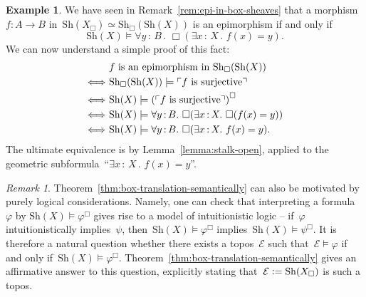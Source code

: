 \documentclass[10pt,reqno,a4paper]{amsbook}
\theoremstyle{definition}
\newtheorem{ex}[defn]{Example}
\theoremstyle{plain}
\theoremstyle{remark}
\newtheorem{rem}[defn]{Remark}
\newcommand{\E}{\mathcal{E}}
\newcommand{\Sh}{\mathrm{Sh}}
\newcommand{\?}{\,{:}\,}
\renewcommand{\_}{\mathpunct{.}\,}
\newcommand{\speak}[1]{\ulcorner\text{\textnormal{#1}}\urcorner}
\newcommand{\defeq}{\vcentcolon=}
\begin{document}
\begin{ex}We have seen in Remark~\ref{rem:epi-in-box-sheaves} that a
morphism~$f : A \to B$ in~$\Sh(X_\Box) \simeq \Sh_\Box(\Sh(X))$ is an
epimorphism if and only if \[ \Sh(X) \models \forall y\?B\_ \Box(\exists x\?X\_
f(x) = y). \] We can now understand a simple proof of this fact:
\begin{align*}
  &\ \text{$f$ is an epimorphism in~$\Sh_\Box(\Sh(X))$} \\
  \Longleftrightarrow&\
    \Sh_\Box(\Sh(X)) \models \speak{$f$ is surjective} \\
  \Longleftrightarrow&\
    \Sh(X) \models \left(\speak{$f$ is surjective}\right)^\Box \\
  \Longleftrightarrow&\
    \Sh(X) \models \forall y\?B\_ \Box(\exists x\?X\_ \Box(f(x) = y)) \\
  \Longleftrightarrow&\
    \Sh(X) \models \forall y\?B\_ \Box(\exists x\?X\_ f(x) = y).
\end{align*}
The ultimate equivalence is by Lemma~\ref{lemma:stalk-open}, applied to the
geometric subformula~``$\exists x\?X\_ f(x) = y$''.
\end{ex}

\begin{rem}Theorem~\ref{thm:box-translation-semantically} can also be motivated
by purely logical considerations. Namely, one can check that interpreting a
formula~$\varphi$ by $\Sh(X) \models \varphi^\Box$ gives rise to a model of
intuitionistic logic -- if~$\varphi$ intuitionistically implies~$\psi$,
then~$\Sh(X) \models \varphi^\Box$ implies~$\Sh(X) \models \psi^\Box$.
It is therefore a natural question whether there exists a
topos~$\E$ such that~$\E \models \varphi$ if and only if~$\Sh(X) \models
\varphi^\Box$. Theorem~\ref{thm:box-translation-semantically} gives an
affirmative answer to this question, explicitly stating that~$\E \defeq
\Sh(X_\Box)$ is such a topos.\end{rem}
\end{document}
